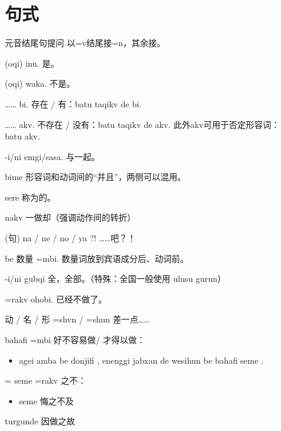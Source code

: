 \pagebreak

\section{句式}

\begin{des}
    \item[元音结尾句提问] 以=v结尾接=n，其余接。
    \item[\A (oqi) \B inu.] 是。
    \item[\A (oqi) \B waka.] 不是。
    \item[…… bi.] 存在 / 有：batu taqikv de bi.
    \item[…… akv.] 不存在 / 没有：batu taqikv de akv. 此外akv可用于否定形容词：\\
        batu    akv.
    \item[\A \B -i/ni emgi/sasa.] \A 与\B 一起。
    \item[\lat{adj./v.} bime \lat{adj./v.}]  形容词和动词间的“并且”，两侧可以混用。
    \item[\A sere \B ] 称为\A 的\B 。
    \item[\V\ftn{命} nakv] 一做\V 却（强调动作间的转折）
    \item[(句) na / ne / no / ya ?!] ……吧？！ 
    \item[\A \B be 数量 \V=mbi.]数量词放到宾语成分后、动词前。 
    \item[\A -i/ni gubqi] 全\A ，全部\A 。（特殊：全国一般使用 ulusu gurun） 
    \item[\V=rakv ohobi.] 已经不做\V 了。
    \item[动 / 名 / 形 =shvn / =shun] 差一点……
    \item[bahafi \V=mbi] 好不容易做\V / 才得以做\V ：
    \begin{itemize}
        \item agei amba  be donjifi , enenggi jabxan de wesihun  be bahafi    seme .
    \end{itemize}
    \item[\V=\ii{=ha}{=he}{=ho} seme \V=rakv] \V 之不\V ：
    \begin{itemize}
        \item {} seme  悔之不及 
    \end{itemize}
    \item[\V\ftn{形} turgunde] 因做\V 之故

\end{des}
